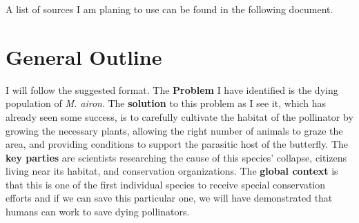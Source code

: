 \documentclass[12pt, twocolumn, letterpaper]{article}
\begin{document}
\noindent A list of sources I am planing to use can be found in the following
document.\\

\section*{General Outline}
I will follow the suggested format. The \textbf{Problem} I have identified is
the dying population of \textit{M. airon}. The \textbf{solution} to this problem as I see
it, which has already seen some success, is to carefully cultivate the habitat
of the pollinator by growing the necessary plants, allowing the right number of
animals to graze the area, and providing conditions to support the parasitic
host of the butterfly. The \textbf{key parties} are scientists researching the
cause of this species' collapse, citizens living near its habitat, and
conservation organizations. The \textbf{global context} is that this is one of
the first individual species to receive special conservation efforts and if we
can save this particular one, we will have demonstrated that humans can work to
save dying pollinators. 
\end{document}
